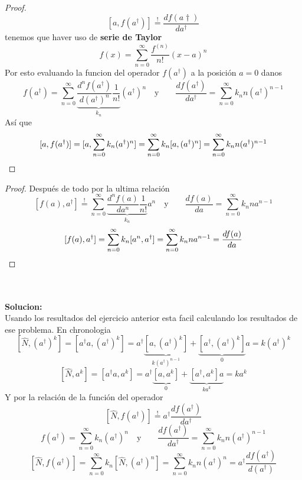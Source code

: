 \begin{enumerate}
\begin{proof}
$$
	[a, f(a^\dagger)] \overset{!}{=} \frac{d f(a\dagger)}{d a^\dagger}
$$
tenemos que haver uso de \textbf{serie de Taylor}
$$
	f(x) = \sum_{n=0}^\infty \frac{f^(n)}{n!}(x-a)^n
$$
Por esto evaluando la funcion del operador $f(a^\dagger)$ a la posición $a=0$
danos
$$
	f(a^\dagger) = \sum_{n=0}^\infty \underbrace{\frac{d^n f(a^\dagger)}{d
(a^\dagger)^n} \frac{1}{n!}}_{k_n} (a^\dagger)^n \quad \text{y} \qquad \frac{d
f(a^\dagger)}{d a^\dagger} = \sum_{n=0}^\infty k_n n (a^\dagger)^{n-1}
$$
Así que
$$
	[a, f(a^\dagger)] = [a, \sum_{n=0}^\infty k_n (a^\dagger)^n ] =
\sum_{n=0}^\infty k_n [a, (a^\dagger)^n] = \sum_{n=0}^\infty k_n
n(a^\dagger)^{n-1} \qedhere
$$
\end{proof}
\begin{proof}
Después de todo por la ultima relación
$$
	[f(a), a^\dagger] \overset{!}{=} \sum_{n=0}^\infty \underbrace{\frac{d^n
f(a)}{d a^n} \frac{1}{n!}}_{k_n} a^n \quad \text{y} \qquad \frac{d f(a)}{da} =
\sum_{n=0}^\infty k_n n a^{n-1}
$$
$$
	[f(a), a^\dagger] = \sum_{n=0}^\infty k_n [a^n, a^\dagger] =
\sum_{n=0}^\infty k_n n a^{n-1} = \frac{d f(a)}{da} \qedhere
$$
\end{proof}

\\\\
\textbf{Solucion:}\\
Usando los resultados del ejercicio anterior esta facil calculando los
resultados de ese problema. En chronologia
$$
	[\hat N, (a^\dagger)^k] = [a^\dagger a, (a^\dagger)^k] = a^\dagger
\underbrace{[a, (a^\dagger)^k]}_{k (a^\dagger)^{n-1}} + \underbrace{[a^\dagger,
(a^\dagger)^k ]}_{0} a = k (a^\dagger)^k
$$
$$
	[\hat N, a^k] = [a^\dagger a, a^k] = a^\dagger \underbrace{[a, a^k]}_0 +
\underbrace{[a^\dagger, a^k] a}_{ka^k} = k a^k
$$
Y por la relación de la función del operador
$$
	[\hat N, f(a^\dagger)] \overset{!}{=} a^\dagger \frac{d f(a^\dagger)}{d
a^\dagger}
$$
$$
	f(a^\dagger) = \sum_{n=0}^\infty k_n (a^\dagger)^n \quad \text{y} \qquad
\frac{d f(a^\dagger)}{d a^\dagger} = \sum_{n=0}^\infty k_n n (a^\dagger)^{n-1}
$$
$$
	[\hat N, f(a^\dagger)] = \sum_{n=0}^\infty k_n [\hat N, (a^\dagger)^n] =
\sum_{n=0}^\infty k_n n (a^\dagger)^n = a^\dagger \frac{d f(a^\dagger)}{d
(a^\dagger)}
$$
\end{enumerate}

